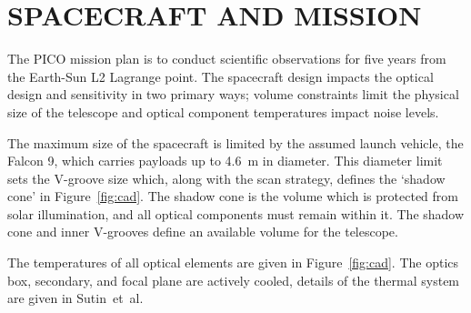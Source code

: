 \documentclass[]{spie}  %
\newcommand{\comr}[1]{\textcolor{red}{#1}}
\begin{document}






\section{SPACECRAFT AND MISSION}
\label{sec:spacecraft}


The PICO mission plan is to conduct scientific observations for five years from the Earth-Sun L2 Lagrange point. The spacecraft design impacts 
the optical design and sensitivity in two primary ways; volume constraints limit the physical size of the telescope and optical component 
temperatures impact noise levels.  

The maximum size of the spacecraft is limited by the assumed launch vehicle, the Falcon 9, which carries payloads up to 4.6~m in diameter. 
This diameter limit sets the V-groove size which, along with the scan strategy, defines the `shadow cone' in Figure~\ref{fig:cad}.  
The shadow cone is the volume which is protected from solar illumination, and all optical components must remain within it. The shadow cone and 
inner V-grooves define an available volume for the telescope.  

The temperatures of all optical elements are given in Figure~\ref{fig:cad}.  The optics box, secondary, and focal plane are actively cooled, 
details of the thermal system are given in Sutin~et~al.\cite{brian_spie} %

\end{document}
